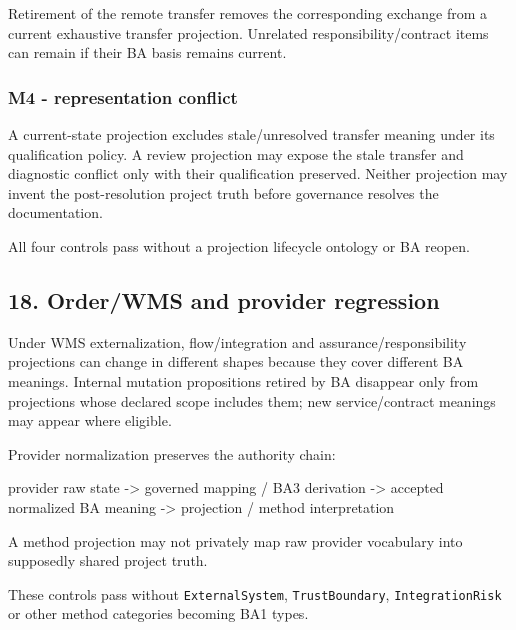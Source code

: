 \documentclass[
  11pt,
  a4paper,
]{article}
\newenvironment{Shaded}{}{}
\newcommand{\NormalTok}[1]{#1}
\begin{document}
Retirement of the remote transfer removes the corresponding exchange
from a current exhaustive transfer projection. Unrelated
responsibility/contract items can remain if their BA basis remains
current.

\subsubsection{M4 - representation
conflict}\label{m4---representation-conflict}

A current-state projection excludes stale/unresolved transfer meaning
under its qualification policy. A review projection may expose the stale
transfer and diagnostic conflict only with their qualification
preserved. Neither projection may invent the post-resolution project
truth before governance resolves the documentation.

All four controls pass without a projection lifecycle ontology or BA
reopen.

\subsection{18. Order/WMS and provider
regression}\label{orderwms-and-provider-regression}

Under WMS externalization, flow/integration and assurance/responsibility
projections can change in different shapes because they cover different
BA meanings. Internal mutation propositions retired by BA disappear only
from projections whose declared scope includes them; new
service/contract meanings may appear where eligible.

Provider normalization preserves the authority chain:

\begin{Shaded}
\begin{Highlighting}[]
\NormalTok{provider raw state}
\NormalTok{    {-}\textgreater{} governed mapping / BA3 derivation}
\NormalTok{        {-}\textgreater{} accepted normalized BA meaning}
\NormalTok{            {-}\textgreater{} projection / method interpretation}
\end{Highlighting}
\end{Shaded}

A method projection may not privately map raw provider vocabulary into
supposedly shared project truth.

These controls pass without \texttt{ExternalSystem},
\texttt{TrustBoundary}, \texttt{IntegrationRisk} or other method
categories becoming BA1 types.
\end{document}
